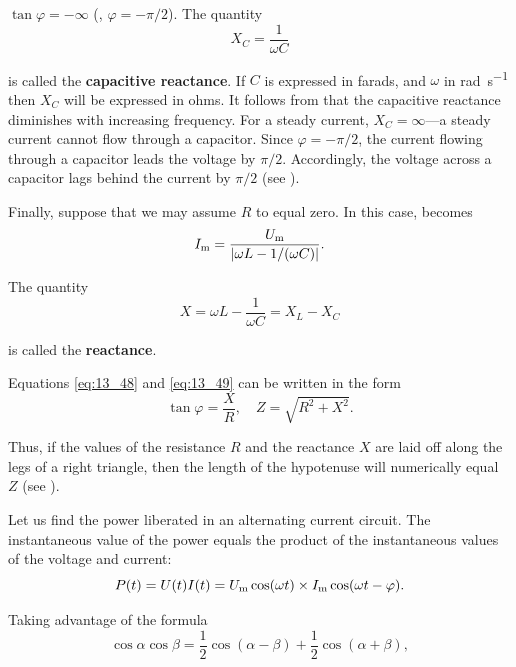 \noindent
$\tan\varphi=-\infty$ (\ie, $\varphi=-\pi/2$).
The quantity
\begin{equation}\label{eq:13_53}
    X_C = \frac{1}{\omega C}
\end{equation}

\noindent
is called the \textbf{capacitive reactance}.
If $C$ is expressed in farads, and $\omega$ in \si{\radian\per\second} then $X_C$ will be expressed in ohms.
It follows from  that the capacitive reactance diminishes with increasing frequency.
For a steady current, $X_C=\infty$---a steady current cannot flow through a capacitor.
Since $\varphi=-\pi/2$, the current flowing through a capacitor leads the voltage by $\pi/2$.
Accordingly, the voltage across a capacitor lags behind the current by $\pi/2$ (see ).

Finally, suppose that we may assume $R$ to equal zero.
In this case,  becomes
\begin{equation}\label{eq:13_54}
    I_{\text{m}} = \frac{U_{\text{m}}}{|\omega L - 1/(\omega C)|}.
\end{equation}

\noindent
The quantity
\begin{equation}\label{eq:13_55}
    X = \omega L - \frac{1}{\omega C} = X_L - X_C
\end{equation}

\noindent
is called the \textbf{reactance}.

Equations \eqref{eq:13_48} and \eqref{eq:13_49} can be written in the form
\begin{equation*}
    \tan\varphi = \frac{X}{R},\quad Z = \sqrt{R^2+X^2}.
\end{equation*}

\noindent
Thus, if the values of the resistance $R$ and the reactance $X$ are laid off along the legs of a right triangle, then the length of the hypotenuse will numerically equal $Z$ (see ).

Let us find the power liberated in an alternating current circuit.
The instantaneous value of the power equals the product of the instantaneous values of the voltage and current:
\begin{equation}\label{eq:13_56}
    P(t) = U(t)I(t) = U_{\text{m}} \cos(\omega t) \times I_{\text{m}} \cos(\omega t - \varphi).
\end{equation}

\noindent
Taking advantage of the formula
\begin{equation*}
    \cos\alpha\cos\beta = \frac{1}{2}\cos(\alpha-\beta) + \frac{1}{2} \cos(\alpha+\beta),
\end{equation*}


